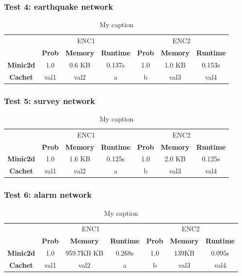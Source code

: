 \documentclass[a4paper,10pt]{report}
\begin{document}
\subsubsection{Test 4: earthquake network}
\begin{table}[H]
\centering
\caption{My caption}
\label{my-label}
\begin{tabular}{c|c|c|c|c|c|c|}
\cline{2-7}
        & \multicolumn{3}{c|}{ENC1} & \multicolumn{3}{c|}{ENC2} \\ \cline{2-7} 
  & \textbf{Prob}  & \textbf{Memory}  & \textbf{Runtime} & \textbf{Prob}  & \textbf{Memory}  & \textbf{Runtime} \\ \cline{1-7} 
  \textbf{Minic2d} & 1.0  & 0.6 KB & 0.137s   & 1.0    & 1.0 KB  & 	0.153s \\
  \hline
\textbf{Cachet}  & val1  & val2    & a       & b     & val3    & val4    \\ \cline{1-7} 
\end{tabular}
\end{table}

\subsubsection{Test 5: survey network}
\begin{table}[H]
\centering
\caption{My caption}
\label{my-label}
\begin{tabular}{c|c|c|c|c|c|c|}
\cline{2-7}
        & \multicolumn{3}{c|}{ENC1} & \multicolumn{3}{c|}{ENC2} \\ \cline{2-7} 
  & \textbf{Prob}  & \textbf{Memory}  & \textbf{Runtime} & \textbf{Prob}  & \textbf{Memory}  & \textbf{Runtime} \\ \cline{1-7} 
  \textbf{Minic2d} & 1.0  & 1.6 KB    & 0.125s   & 1.0    & 2.0 KB    & 	0.125s \\
  \hline
\textbf{Cachet}  & val1  & val2    & a       & b     & val3    & val4    \\ \cline{1-7} 
\end{tabular}
\end{table}

\subsubsection{Test 6: alarm network}
\begin{table}[H]
\centering
\caption{My caption}
\label{my-label}
\begin{tabular}{c|c|c|c|c|c|c|}
\cline{2-7}
        & \multicolumn{3}{c|}{ENC1} & \multicolumn{3}{c|}{ENC2} \\ \cline{2-7} 
  & \textbf{Prob}  & \textbf{Memory}  & \textbf{Runtime} & \textbf{Prob}  & \textbf{Memory}  & \textbf{Runtime} \\ \cline{1-7} 
  \textbf{Minic2d} & 1.0  & 959.7KB KB    & 0.268s   & 1.0    & 139KB    & 	0.095s \\
  \hline
\textbf{Cachet}  & val1  & val2    & a       & b     & val3    & val4    \\ \cline{1-7} 
\end{tabular}
\end{table}
\end{document}
